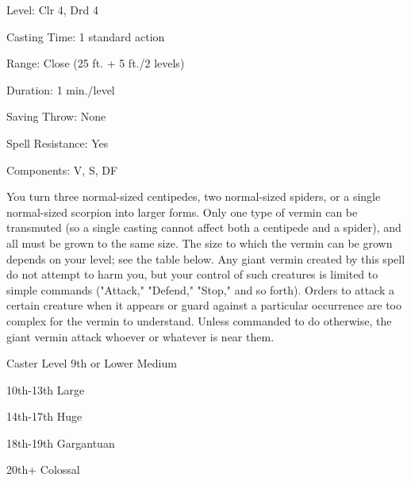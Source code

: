 
\begin{description*}
\item[Level:] Clr 4, Drd 4
\item[Casting Time:] 1 standard action
\item[Range:] Close (25 ft. + 5 ft./2 levels)
\item[Duration:] 1 min./level
\item[Saving Throw:] None
\item[Spell Resistance:] Yes
\item[Components:] V, S, DF
\end{description*}

You turn three normal-sized centipedes, two normal-sized spiders, or a single normal-sized
scorpion into larger forms. Only one type of vermin can be transmuted (so a single
casting cannot affect both a centipede and a spider), and all must be grown to
the same size. The size to which the vermin can be grown depends on your level;
see the table below.
Any giant vermin created by this spell do not attempt to harm you, but your control
of such creatures is limited to simple commands ("Attack," "Defend," "Stop,"
and so forth). Orders to attack a certain creature when it appears or guard against
a particular occurrence are too complex for the vermin to understand. Unless commanded
to do otherwise, the giant vermin attack whoever or whatever is near them.
\begin{description*}
\item[Caster Level 9th or Lower] Medium
\item[10th-13th] Large
\item[14th-17th] Huge
\item[18th-19th] Gargantuan
\item[20th+] Colossal
\end{description*}